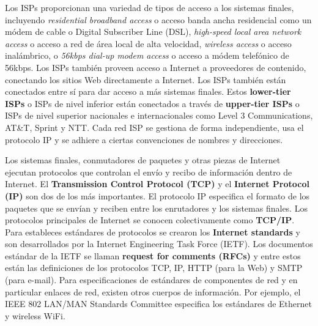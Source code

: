 Los ISPs proporcionan una variedad de tipos de acceso a los sistemas finales, incluyendo \textit{residential broadband access} o acceso banda ancha residencial como un módem de cable o Digital Subscriber Line (DSL), \textit{high-speed local area network access} o acceso a red de área local de alta velocidad, \textit{wireless access} o acceso inalámbrico, o \textit{56kbps dial-up modem access} o acceso a módem telefónico de 56kbps. Los ISPs también proveen acceso a Internet a proveedores de contenido, conectando los sitios Web directamente a Internet. Los ISPs también están conectados entre sí para dar acceso a más sistemas finales. Estos \textbf{lower-tier ISPs} o ISPs de nivel inferior están conectados a través de \textbf{upper-tier ISPs} o ISPs de nivel superior nacionales e internacionales como Level 3 Communications, AT\&T, Sprint y NTT. Cada red ISP se gestiona de forma independiente, usa el protocolo IP y se adhiere a ciertas convenciones de nombres y direcciones.
\bigskip

Los sistemas finales, conmutadores de paquetes y otras piezas de Internet ejecutan protocolos que controlan el envío y recibo de información dentro de Internet. El \textbf{Transmission Control Protocol (TCP)} y el \textbf{Internet Protocol (IP)} son dos de los más importantes. El protocolo IP especifica el formato de los paquetes que se envían y reciben entre los enrutadores y los sistemas finales. Los protocolos principales de Internet se conocen colectivamente como \textbf{TCP/IP}. Para estableces estándares de protocolos se crearon los \textbf{Internet standards} y son desarrollados por la Internet Engineering Task Force (IETF). Los documentos estándar de la IETF se llaman \textbf{request for comments (RFCs)} y entre estos están las definiciones de los protocolos TCP, IP, HTTP (para la Web) y SMTP (para e-mail). Para especificaciones de estándares de componentes de red y en particular enlaces de red, existen otros cuerpos de información. Por ejemplo, el IEEE 802 LAN/MAN Standards Committee especifica los estándares de Ethernet y wireless WiFi.

